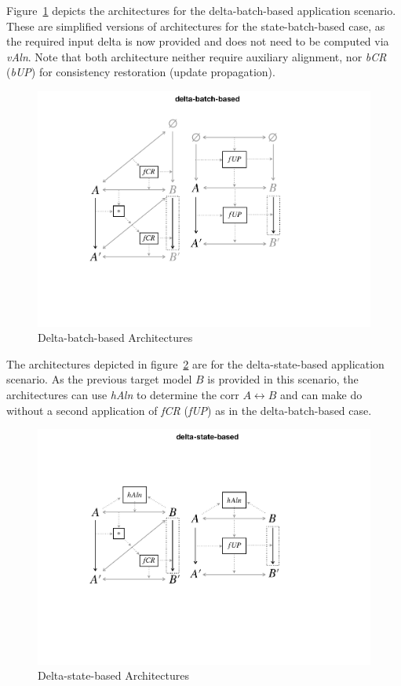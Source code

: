 Figure~\ref{fig:deltaBatchBased} depicts the architectures for the delta-batch-based application scenario.
These are simplified versions of architectures for the state-batch-based case, as the required input delta is now provided and does not need to be computed via \emph{vAln}.
Note that both architecture neither require auxiliary alignment, nor \emph{bCR} (\emph{bUP}) for consistency restoration (update propagation).  
\begin{figure}[tb!]
	\centering
	\includegraphics[width=0.73\columnwidth]{diagrams/foundations/delta-batch-based}
	\caption{Delta-batch-based Architectures}
	\label{fig:deltaBatchBased}
\end{figure}

The architectures depicted in figure~\ref{fig:deltaStateBased} are for the delta-state-based application scenario.
As the previous target model $B$ is provided in this scenario, the architectures can use \emph{hAln} to determine the corr $A \leftrightarrow B$ and can make do without a second application of \emph{fCR} (\emph{fUP}) as in the delta-batch-based case.  
\begin{figure}[tb!]
	\centering
	\includegraphics[width=0.75\columnwidth]{diagrams/foundations/delta-state-based}
	\caption{Delta-state-based Architectures}
	\label{fig:deltaStateBased}
\end{figure}

